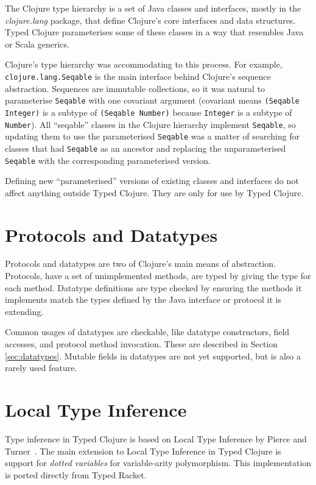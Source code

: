 The Clojure type hierarchy is a set of Java classes and interfaces, mostly in the
\emph{clojure.lang} package, that define Clojure's core 
interfaces and data structures.
Typed Clojure parameterises some of these classes in a way that resembles
Java or Scala generics.

Clojure's type hierarchy was accommodating to this process.
For example, \lstinline{clojure.lang.Seqable} is the main interface behind
Clojure's sequence abstraction. Sequences are immutable collections,
so it was natural to parameterise \lstinline{Seqable} with one covariant
argument (covariant means \lstinline|(Seqable Integer)| is
a subtype of \lstinline|(Seqable Number)| because \lstinline|Integer|
is a subtype of \lstinline|Number|).
All ``seqable'' classes in the Clojure hierarchy implement \lstinline|Seqable|,
so updating them to use the parameterised \lstinline|Seqable| was a matter of
searching for classes that had \lstinline|Seqable| as an ancestor and replacing
the unparameterised \lstinline|Seqable| with the corresponding parameterised 
version.

Defining new ``parameterised'' versions of existing classes and interfaces do 
not affect anything outside Typed Clojure.
They are only for use by Typed Clojure.

\section{Protocols and Datatypes}

Protocols and datatypes are two of Clojure's main means of abstraction.
Protocols, have a set of unimplemented methods, are typed by
giving the type for each method.
Datatype definitions are type checked by ensuring the methods it
implements match the types defined by the Java interface or protocol
it is extending.

Common usages of datatypes are checkable, like datatype
constructors, field accesses, and protocol method invocation.
These are described in Section \ref{sec:datatypes}.
Mutable fields in datatypes are not yet supported, but is
also a rarely used feature.

\section{Local Type Inference}

Type inference in Typed Clojure is based on Local Type Inference
by Pierce and Turner~\cite{PT00}.
The main extension to Local Type Inference in Typed Clojure
is support for \emph{dotted variables} for variable-arity polymorphism.
This implementation is ported directly from Typed Racket.

